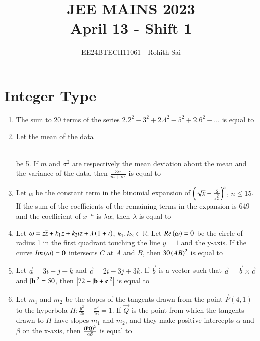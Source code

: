 \documentclass[journal]{IEEEtran}
\begin{document}

\vspace{3cm}

\title{JEE MAINS 2023\\April 13 - Shift 1}
\author{EE24BTECH11061 - Rohith Sai}
\maketitle

\renewcommand{\thefigure}{\theenumi}
\renewcommand{\thetable}{\theenumi}

\section*{Integer Type}
\begin{enumerate}
\item The sum to 20 terms of the series $2.2^2 - 3^2 + 2.4^2 - 5^2 + 2.6^2-\dots$ is equal to

\item Let the mean of the data
\begin{table}[h!]
      \centering
      
      \caption{}
\end{table}\\
be 5. If $m$ and $\sigma^2$ are respectively the mean deviation about the mean and the variance of the data, then $\frac{3\alpha}{m+\sigma^2}$ is equal to

\item Let $\alpha$ be the constant term in the binomial expansion of $\left(\sqrt{x} - \frac{6}{x^{\frac{3}{2}}}\right)^n$, $n \leq 15$. If the sum of the coefficients of the remaining terms in the expansion is 649 and the coefficient of $x^{-n}$ is $\lambda\alpha$, then $\lambda$ is equal to

\item Let $\omega = z\overline{z} + k_1 z + k_2 \iota z + \lambda\left(1+\iota\right)$, $k_1, k_2 \in \mathbb{R}$. Let $Re\left(\omega\right) = 0$ be the circle of radius 1 in the first quadrant touching the line $y=1$ and the y-axis. If the curve $Im\left(\omega\right) = 0$ intersects $C$ at $A$ and $B$, then $30\left(AB\right)^2$ is equal to

\item Let $\vec{a} = 3i + j -k$ and $\vec{c} = 2i-3j+3k$. If $\vec{b}$ is a vector such that $\vec{a} = \vec{b} \times \vec{c}$ and $\left\vert\mathbf{b}\right\vert^2 = 50$, then $\left\vert72-\left\vert\mathbf{b} + \mathbf{c}\right\vert^2\right\vert$ is equal to

\item Let $m_1$ and $m_2$ be the slopes of the tangents drawn from the point $\vec{P}(4, 1)$ to the hyperbola $H: \frac{y^2}{25} - \frac{x^2}{16} = 1$. If $\vec{Q}$ is the point from which the tangents drawn to $H$ have slopes $m_1$ and $m_2$, and they make positive intercepts $\alpha$ and $\beta$ on the x-axis, then $\frac{\left(\mathbf{P}\mathbf{Q}\right)^2}{\alpha \beta}$ is equal to


\end{enumerate}
\end{document}

